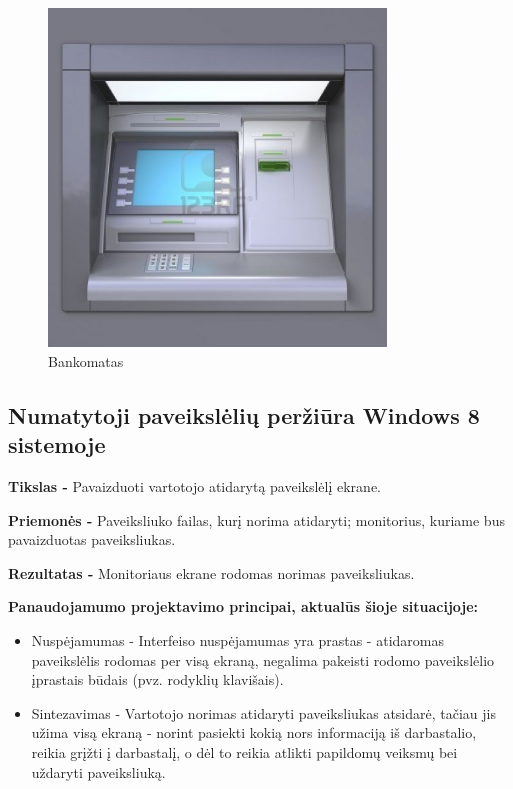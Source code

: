 ﻿\documentclass[a4paper, 12pt]{article}
\begin{document}
		\begin{figure}[h]
		\centering
		\includegraphics[width=0.8\textwidth]{images/atm.jpg}
		\caption{Bankomatas}
		\label{bankomatas}
		\end{figure}
		\newpage %
		
	\subsection{Numatytoji paveikslėlių peržiūra Windows 8 sistemoje}
		\textbf{Tikslas -}
		Pavaizduoti vartotojo atidarytą paveikslėlį ekrane.
		
		\textbf{Priemonės -}
		Paveiksliuko failas, kurį norima atidaryti; monitorius, kuriame bus pavaizduotas paveiksliukas.

		\textbf{Rezultatas -}
		Monitoriaus ekrane rodomas norimas paveiksliukas.

		\textbf{Panaudojamumo projektavimo principai, aktualūs šioje situacijoje:}
		\begin{itemize}
		\item Nuspėjamumas - Interfeiso nuspėjamumas yra prastas - atidaromas paveikslėlis rodomas per visą ekraną, negalima pakeisti rodomo paveikslėlio įprastais būdais (pvz. rodyklių klavišais).
		\item Sintezavimas - Vartotojo norimas atidaryti paveiksliukas atsidarė, tačiau jis užima visą ekraną - norint pasiekti kokią nors informaciją iš darbastalio, reikia grįžti į darbastalį, o dėl to reikia atlikti papildomų veiksmų bei uždaryti paveiksliuką.
		\end{itemize}
\end{document}
